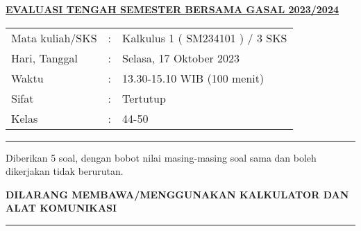 \documentclass[10pt,openany,a4paper]{article}
\begin{document}
    \begin{center}
	{\underline{\textbf{\MakeUppercase{Evaluasi Tengah Semester Bersama Gasal 2023/2024}}}}
    \end{center}

    \begin{center}
	\begin{tabular}{lcl}
		Mata kuliah/SKS & : & Kalkulus 1 ( SM234101 ) / 3 SKS\\
		Hari, Tanggal & : & Selasa, 17 Oktober 2023\\
		Waktu & : & 13.30-15.10 WIB (100 menit)\\
		Sifat & : & Tertutup\\
		Kelas & : & 44-50
	\end{tabular}
    \end{center}
	
    \noindent\rule{\textwidth}{2.pt}
	
    \setlength{\parindent}{5pt}
    \par Diberikan 5 soal, dengan bobot nilai masing-masing soal sama dan boleh dikerjakan tidak berurutan.
    \setlength{\parindent}{5pt}
    \setlength{\parindent}{5pt}
    {\small
    \par \textbf{\MakeUppercase{Dilarang membawa/menggunakan kalkulator dan alat komunikasi}}
    }
    \par {}
	
    \noindent\rule{\textwidth}{2.pt}
	
\end{document}
